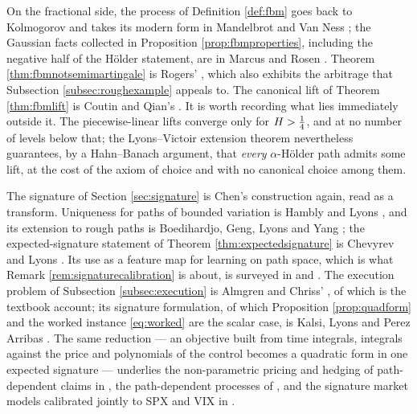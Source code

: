 \noindent
On the fractional side, the process of Definition \ref{def:fbm} goes back to Kolmogorov and takes its
modern form in Mandelbrot and Van Ness \cite{mandelbrotvanness1968}; the Gaussian facts collected in
Proposition \ref{prop:fbmproperties}, including the negative half of the Hölder statement, are in
Marcus and Rosen \cite[Ch.\ 7]{marcusrosen2006}. Theorem \ref{thm:fbmnotsemimartingale} is Rogers'
\cite{rogers1997}, which also exhibits the arbitrage that Subsection \ref{subsec:roughexample} appeals
to.  The
canonical lift of Theorem \ref{thm:fbmlift} is Coutin and Qian's \cite{coutinqian2002}. It is worth
recording what lies immediately outside it. The
piecewise-linear lifts converge only for $H>\tfrac14$, and at no number of levels below that;
the Lyons--Victoir extension theorem \cite{lyonsvictoir2007} nevertheless guarantees, by a
Hahn--Banach argument, that \emph{every} $\alpha$-Hölder path admits some lift, at the cost of the
axiom of choice and with no canonical choice among them. 
\medskip

\noindent
The signature of Section \ref{sec:signature} is Chen's construction again, read as a transform.
Uniqueness for paths of bounded variation is Hambly and Lyons \cite{hamblylyons2010}, and its
extension to rough paths is Boedihardjo, Geng, Lyons and Yang \cite{boedihardjo2016}; the
expected-signature statement of Theorem \ref{thm:expectedsignature} is Chevyrev and Lyons
\cite{chevyrevlyons2016}. Its use as a feature map for learning on path space, which is what
Remark \ref{rem:signaturecalibration} is about, is surveyed in \cite{chevyrevkormilitzin2016} and
\cite{levinlyonsni2013}. The execution problem of Subsection \ref{subsec:execution} is Almgren and
Chriss' \cite{almgrenchriss2001}, of which \cite{carteajaimungal2015} is the textbook account; its
signature formulation, of which Proposition \ref{prop:quadform} and the worked instance
\eqref{eq:worked} are the scalar case, is Kalsi, Lyons and Perez Arribas \cite{kalsi2020}. The same
reduction --- an objective built from time integrals, integrals against the price and polynomials of
the control becomes a quadratic form in one expected signature --- underlies the non-parametric
pricing and hedging of path-dependent claims in \cite{lyonsnejadperez2020}, the path-dependent
processes of \cite{abijaber2024}, and the signature market models calibrated jointly to SPX and VIX
in \cite{cuchiero2025}.

\medskip

